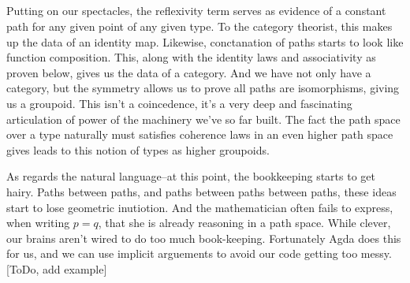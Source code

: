 \begin{code}
\AgdaSpace{}%
\AgdaSpace{}%
\AgdaSpace{}%
\AgdaSymbol{=}\AgdaSpace{}%
\AgdaSymbol{(}\AgdaSpace{}%
\AgdaSymbol{:}\AgdaSpace{}%
\AgdaSymbol{)}\AgdaSpace{}%
\AgdaSpace{}%
\AgdaSymbol{(}\AgdaSpace{}%
\AgdaSymbol{:}\AgdaSpace{}%
\AgdaSpace{}%
\AgdaSpace{}%
\AgdaSymbol{)}\AgdaSpace{}%
\AgdaSpace{}%
\AgdaSpace{}%
\AgdaSpace{}%
\<%
\\
%
\>[6]\AgdaSpace{}%
\AgdaSymbol{:}\AgdaSpace{}%
\AgdaSymbol{(}\AgdaSpace{}%
\AgdaSymbol{:}\AgdaSpace{}%
\AgdaSymbol{)}\AgdaSpace{}%
\AgdaSpace{}%
\AgdaSpace{}%
\AgdaSpace{}%
\AgdaSpace{}%
\<%
\\
%
\>[6]\AgdaSpace{}%
\AgdaSymbol{=}\AgdaSpace{}%
\AgdaSpace{}%
\AgdaSpace{}%
\AgdaSpace{}%
\AgdaSpace{}%
\AgdaSpace{}%
\<%
\\
%
\\[\AgdaEmptyExtraSkip]%
%
\>[2]\AgdaSpace{}%
\AgdaSpace{}%
\<%
\end{code}

Putting on our spectacles, the reflexivity term serves as evidence of a
constant path for any given point of any given type. To the category theorist,
this makes up the data of an identity map. Likewise, conctanation of paths
starts to look like function composition. This, along with the identity laws
and associativity as proven below, gives us the data of a category. And we have
not only have a category, but the symmetry allows us to prove all paths are
isomorphisms, giving us a groupoid. This isn't a coincedence, it's a very deep
and fascinating articulation of power of the machinery we've so far built. The
fact the path space over a type naturally must satisfies coherence laws in an
even higher path space gives leads to this notion of types as higher groupoids.  

As regards the natural language--at this point, the bookkeeping starts to get hairy.  Paths between paths, and paths between paths between paths, these ideas start to lose geometric inutiotion. And the mathematician often fails to express, when writing $p= q$, that she is already reasoning in a path space. While clever, our brains aren't wired to do too much book-keeping.  Fortunately Agda does this for us, and we can use implicit arguements to avoid our code getting too messy.  [ToDo, add example]

